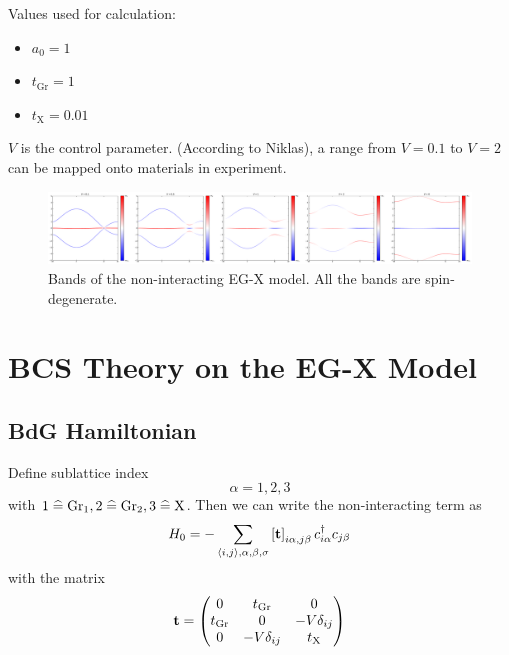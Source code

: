 \documentclass[../main.tex]{subfiles}
\begin{document}
Values used for calculation:
\begin{itemize}
    \item \(a_0 = 1\)
    \item \(t_{\mathrm{Gr}} = 1\)
    \item \(t_{\mathrm{X}} = 0.01\)
\end{itemize}
\(V\) is the control parameter.
(According to Niklas), a range from \(V = 0.1\) to \(V = 2\) can be mapped onto materials in experiment.

\begin{figure}[t]
    \centering
    \includegraphics[width=\textwidth]{images/EG_X bands_tGr_1_tX_0.01}
    \caption{Bands of the non-interacting EG-X model. All the bands are spin-degenerate.}
    \label{fig:EG-X model non-interacting bands}
\end{figure}

\section{BCS Theory on the EG-X Model}\label{sec:bcs-theory-on-the-eg-x-model}

\subsection{BdG Hamiltonian}

Define sublattice index
\begin{equation}
    \alpha = 1, 2, 3
\end{equation}
with \(1 \mathrel{\widehat{=}} \mathrm{Gr}_1, 2 \mathrel{\widehat{=}} \mathrm{Gr}_2, 3 \mathrel{\widehat{=}} \mathrm{X}\).
Then we can write the non-interacting term as
\begin{equation}
    H_0 = - \sum_{\langle i, j \rangle, \alpha, \beta, \sigma} \left[\textbf{t} \right]_{i\alpha,j\beta} c_{i\alpha}^{\dagger} c_{j\beta}
\end{equation}
with the matrix 
\begin{equation}
    \textbf{t} = \begin{pmatrix}
                  0 & t_{\mathrm{Gr}} & 0 \\
                  t_{\mathrm{Gr}} & 0 & -V \delta_{ij} \\
                  0 & -V \delta_{ij} & t_{\mathrm{X}} \\
    \end{pmatrix}
\end{equation}
\end{document}
